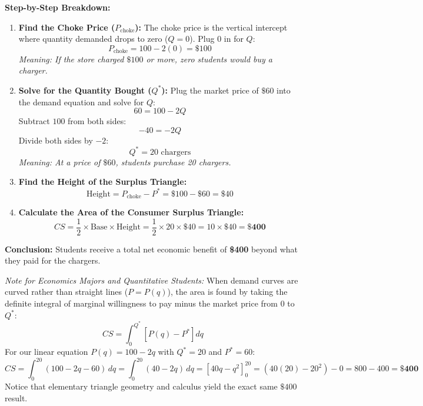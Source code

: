 \documentclass[11pt,letterpaper]{article}
\begin{document}
\noindent\textbf{Step-by-Step Breakdown:}
\begin{enumerate}
    \item \textbf{Find the Choke Price ($P_{\text{choke}}$):} The choke price is the vertical intercept where quantity demanded drops to zero ($Q = 0$). Plug $0$ in for $Q$:
    \[
    P_{\text{choke}} = 100 - 2(0) = \$100
    \]
    \emph{Meaning: If the store charged $\$100$ or more, zero students would buy a charger.}
    
    \item \textbf{Solve for the Quantity Bought ($Q^*$):} Plug the market price of $\$60$ into the demand equation and solve for $Q$:
    \[
    60 = 100 - 2Q
    \]
    Subtract $100$ from both sides:
    \[
    -40 = -2Q
    \]
    Divide both sides by $-2$:
    \[
    Q^* = 20\text{ chargers}
    \]
    \emph{Meaning: At a price of $\$60$, students purchase 20 chargers.}
    
    \item \textbf{Find the Height of the Surplus Triangle:}
    \[
    \text{Height} = P_{\text{choke}} - P^* = \$100 - \$60 = \$40
    \]
    
    \item \textbf{Calculate the Area of the Consumer Surplus Triangle:}
    \[
    CS = \frac{1}{2} \times \text{Base} \times \text{Height} = \frac{1}{2} \times 20 \times \$40 = 10 \times \$40 = \mathbf{\$400}
    \]
\end{enumerate}
\textbf{Conclusion:} Students receive a total net economic benefit of \textbf{\$400} beyond what they paid for the chargers.

\begin{tcolorbox}[colback=blue!5!white,colframe=blue!75!black,title=\textbf{Optional Advanced Section: Calculus Extension}]
\small
\emph{Note for Economics Majors and Quantitative Students:} 
When demand curves are curved rather than straight lines ($P = P(q)$), the area is found by taking the definite integral of marginal willingness to pay minus the market price from 0 to $Q^*$:
\[
CS = \int_{0}^{Q^*} \left[ P(q) - P^* \right] dq
\]
For our linear equation $P(q) = 100 - 2q$ with $Q^* = 20$ and $P^* = 60$:
\[
CS = \int_{0}^{20} (100 - 2q - 60)\,dq = \int_{0}^{20} (40 - 2q)\,dq = \left[ 40q - q^2 \right]_{0}^{20} = (40(20) - 20^2) - 0 = 800 - 400 = \mathbf{\$400}
\]
Notice that elementary triangle geometry and calculus yield the exact same $\$400$ result.
\end{tcolorbox}

\end{document}
